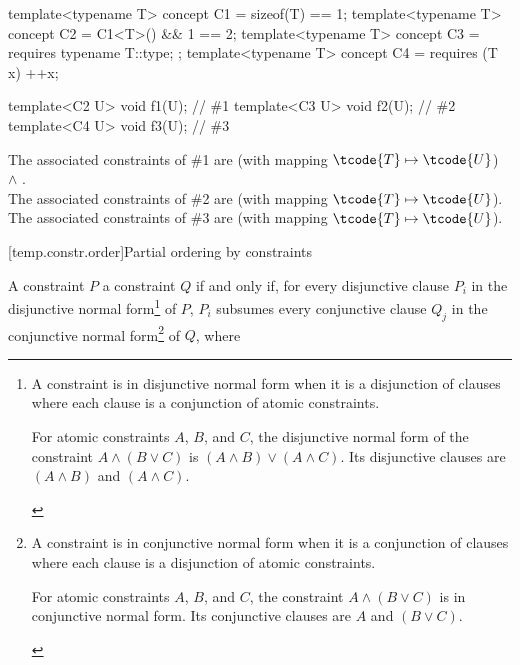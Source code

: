 \pnum
\begin{example}
\begin{codeblock}
template<typename T> concept C1 = sizeof(T) == 1;
template<typename T> concept C2 = C1<T>() && 1 == 2;
template<typename T> concept C3 = requires { typename T::type; };
template<typename T> concept C4 = requires (T x) { ++x; }

template<C2 U> void f1(U);      // \#1
template<C3 U> void f2(U);      // \#2
template<C4 U> void f3(U);      // \#3
\end{codeblock}
The associated constraints of \#1 are
 (with mapping $\tcode{T} \mapsto \tcode{U}$) $\land$ .\\
The associated constraints of \#2 are
 (with mapping $\tcode{T} \mapsto \tcode{U}$).\\
The associated constraints of \#3 are
 (with mapping $\tcode{T} \mapsto \tcode{U}$).
\end{example}

[temp.constr.order]{Partial ordering by constraints}

\pnum
A constraint $P$  a constraint $Q$
if and only if,
for every disjunctive clause $P_i$
in the disjunctive normal form\footnote{
A constraint is in disjunctive normal form when it is a disjunction of
clauses where each clause is a conjunction of atomic constraints.
\begin{example}
For atomic constraints $A$, $B$, and $C$, the disjunctive normal form
of the constraint
$A \land (B \lor C)$
is
$(A \land B) \lor (A \land C)$.
%
Its disjunctive clauses are $(A \land B)$ and $(A \land C)$.
\end{example}%
}
of $P$, $P_i$ subsumes every conjunctive clause $Q_j$
in the conjunctive normal form\footnote{
A constraint is in conjunctive normal form when it is a conjunction
of clauses where each clause is a disjunction of atomic constraints.
\begin{example}
For atomic constraints $A$, $B$, and $C$, the constraint
$A \land (B \lor C)$ is in conjunctive normal form.
%
Its conjunctive clauses are $A$ and $(B \lor C)$.
\end{example}%
}
of $Q$, where

